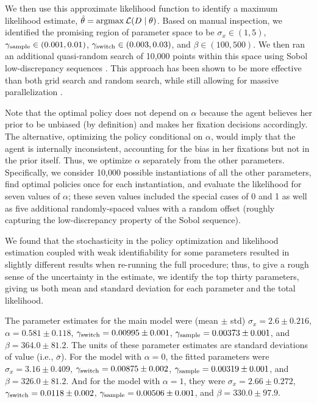 We then use this approximate likelihood function to identify a maximum likelihood estimate, $\hat{\theta}=\operatorname*{argmax} \mathcal{L}(D \mid \theta)$. Based on manual inspection, we identified the promising region of parameter space to be $\sigma_{x}\in(1,5)$, $\gamma_\text{sample}\in(0.001,0.01)$, $\gamma_\text{switch}\in(0.003,0.03)$, and $\beta\in(100,500)$.
We then ran an additional quasi-random search of 10,000 points within this space using Sobol low-discrepancy sequences \citep{sobol1967distribution}. This approach has been shown to be more effective than both grid search and random search, while still allowing for massive parallelization \citep{bergstra2012random}. 

Note that the optimal policy does not depend on $\alpha$ because the agent believes her prior to be unbiased (by definition) and makes her fixation decisions accordingly.
The alternative, optimizing the policy conditional on $\alpha$, would imply that the agent is internally inconsistent, accounting for the bias in her fixations but not in the prior itself.
Thus, we optimize $\alpha$ separately from the other parameters.
Specifically, we consider 10,000 possible instantiations of all the other parameters, find optimal policies once for each instantiation, and evaluate the likelihood for seven values of $\alpha$; these seven values included the special cases of 0 and 1 as well as five additional randomly-spaced values with a random offset (roughly capturing the low-discrepancy property of the Sobol sequence).

We found that the stochasticity in the policy optimization and likelihood estimation coupled with weak identifiability for some parameters resulted in slightly different results when re-running the full procedure; thus, to give a rough sense of the uncertainty in the estimate, we identify the top thirty parameters, giving us both mean and standard deviation for each parameter and the total likelihood.

The parameter estimates for the main model were (mean $\pm$ std)
$\sigma_x = 2.6 \pm 0.216$,
$\alpha = 0.581 \pm 0.118$,
$\gamma_\text{switch} =  0.00995 \pm 0.001$,
$\gamma_\text{sample} = 0.00373 \pm 0.001$, and
$\beta = 364.0 \pm 81.2$.
The units of these parameter estimates are standard deviations of value (i.e., $\bar{\sigma}$). 
%
For the model with $\alpha = 0$, the fitted parameters were
$\sigma_x = 3.16 \pm 0.409$,
$\gamma_\text{switch} =  0.00875 \pm 0.002$,
$\gamma_\text{sample} = 0.00319 \pm 0.001$, and
$\beta = 326.0 \pm 81.2$.
%
And for the model with $\alpha = 1$, they were
$\sigma_x = 2.66 \pm 0.272$,
$\gamma_\text{switch} =   0.0118 \pm 0.002$,
$\gamma_\text{sample} = 0.00506 \pm 0.001$, and
$\beta = 330.0 \pm 97.9$.
